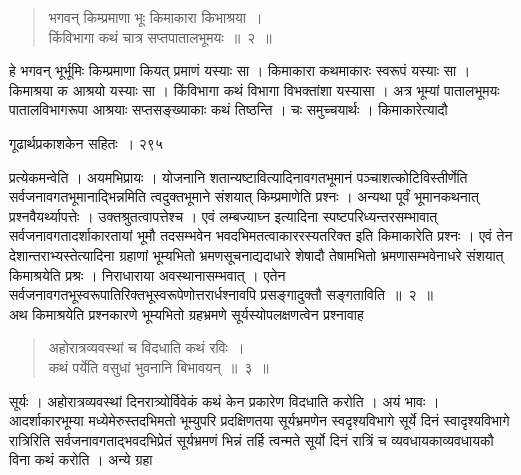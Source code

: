 \documentclass[11pt, openany]{book}
\begin{document}

\begin{quote}
{\ssi भगवन् किम्प्रमाणा भूः किमाकारा किभाश्रया~।\\
किंविभागा कथं चात्र सप्तपातालभूमयः~॥~२~॥ }
\end{quote}

 हे भगवन् भूर्भूमिः किम्प्रमाणा कियत् प्रमाणं यस्याः सा । किमाकारा कथमाकारः स्वरूपं यस्याः सा । किमाश्रया क आश्रयो यस्याः सा । किंविभागा कथं विभागा विभक्तांशा यस्यासा । अत्र भूम्यां पातालभूमयः पातालविभागरूपा आश्रयाः सप्तसङ्ख्याकाः कथं तिष्ठन्ति । चः समुच्चयार्थः । किमाकारेत्यादौ \textendash


\newpage

\hspace{3cm} गूढार्थप्रकाशकेन सहितः~। \hfill २९५
\vspace{1cm}


\noindent प्रत्येकमन्वेति । अयमभिप्रायः । योजनानि शतान्यष्टावित्यादिनावगतभूमानं पञ्चाशत्कोटिविस्तीर्णेति सर्वजनावगतभूमानाद्भिन्नमिति त्वदुक्तभूमाने संशयात् किम्प्रमाणेति प्रश्नः । अन्यथा पूर्वं भूमानकथनात् प्रश्नवैयर्थ्यापत्तेः । उक्तश्रुतत्वापत्तेश्च । एवं लम्बज्याघ्न इत्यादिना स्पष्टपरिध्यन्तरसम्भावात् सर्वजनावगतादर्शाकारतायां भूमौ तदसम्भवेन भवदभिमतत्वाकाररस्यतरिक्त इति किमाकारेति प्रश्नः । एवं तेन देशान्तराभ्यस्तेत्यादिना ग्रहाणां भूम्यभितो भ्रमणसूचनाद्यदाधारे शेषादौ तेषामभितो भ्रमणासम्भवेनाधरे संशयात् किमाश्रयेति प्रश्रः । निराधाराया अवस्थानासम्भवात् । एतेन सर्वजनावगतभूस्वरूपातिरिक्तभूस्वरूपेणोत्तरार्धश्नावपि प्रसङ्गादुक्तौ सङ्गताविति~॥~२~॥\\
\noindent अथ किमाश्रयेति प्रश्नकारणे भूम्यभितो ग्रहभ्रमणे सूर्यस्योपलक्षणत्वेन प्रश्नावाह \textendash

\begin{quote}
{\ssi अहोरात्रव्यवस्थां च विदधाति कथं रविः~।\\
कथं पर्येति वसुधां भुवनानि बिभावयन्~॥~३~॥}
\end{quote}
 सूर्यः । अहोरात्रव्यवस्थां दिनरात्र्योर्विवेकं कथं केन प्रकारेण विदधाति करोति । अयं भावः । आदर्शाकारभूम्या मध्येमेरुस्तदभिमतो भूम्युपरि प्रदक्षिणतया सूर्यभ्रमणेन स्वदृश्यविभागे सूर्ये दिनं स्वादृश्यविभागे रात्रिरिति सर्वजनावगताद्भवदभिप्रेतं सूर्यभ्रमणं भिन्नं तर्हि त्वन्मते सूर्यो दिनं रात्रिं च व्यवधायकाव्यवधायकौ विना कथं करोति । अन्ये ग्रहा \textendash


\newpage
\end{document}
